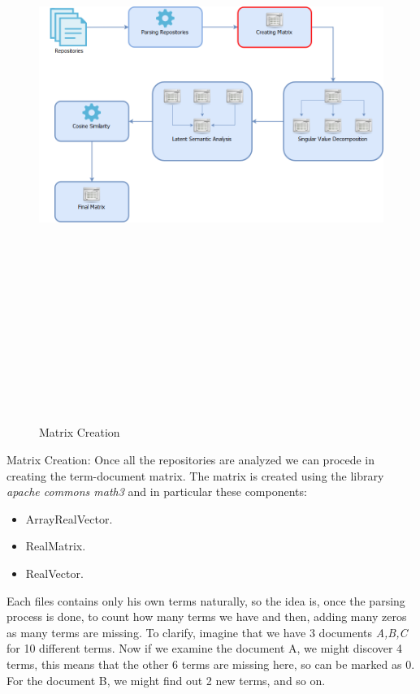 \begin{figure}[H]
\includegraphics[width=15cm,height=20cm,keepaspectratio]{images/Architecture2.png}
\caption{Matrix Creation}
\end{figure}

Matrix Creation: Once all the repositories are analyzed we can procede in creating the term-document matrix. The matrix is created using the library \emph{apache commons math3} and in particular these components:
\begin{itemize}
\item ArrayRealVector.
\item RealMatrix.
\item RealVector.
\end{itemize}
Each files contains only his own terms naturally, so the idea is, once the parsing process is done, to count how many terms we have and then, adding many zeros as many terms are missing. To clarify, imagine that we have 3 documents \emph{A,B,C} for 10 different terms.
Now if we examine the document A, we might discover 4 terms, this means that the other 6 terms are missing here, so can be marked as 0. 
For the document B, we might find out 2 new terms, and so on.

